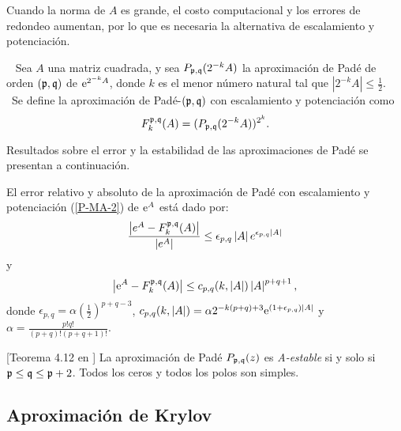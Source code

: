 Cuando la norma de $A$ es grande, el costo computacional y los errores de redondeo aumentan, por lo que
es necesaria la alternativa de escalamiento y potenciación.

\begin{definition}\cite{golub2013matrix}~
    Sea $A$ una matriz cuadrada, y sea $P_{\pf,\qf}(2^{-k}A%
    )$ la aproximación de Padé de orden $(\mathfrak{p},\mathfrak{q})\ $de $\me{2^{-k}A%
    }$, donde $k$ es el menor número natural tal que $\left\vert 2^{-k}A%
    \right\vert \leq \frac{1}{2}$. \ Se define la aproximación de  Padé-$(\mathfrak{p},\mathfrak{q})$ con escalamiento y potenciación como 
    \begin{equation}
    F_{k}^{\mathfrak{p},\mathfrak{q}}(A)=(P_{\mathfrak{p},\mathfrak{q}}(2^{-k}A))^{2^{k}}.
    \label{P-MA-2}
    \end{equation}
\end{definition}

Resultados sobre el error y la estabilidad de las aproximaciones de Padé se presentan a continuación.

\begin{theorem}
    \label{Conv. Pade}\cite{jimenez2012convergence} El error
    relativo y absoluto de la aproximación de Padé con escalamiento y
    potenciación (\ref{P-MA-2}) de $\mathrm{e}^{A}$ está dado por: 
    \[
    \frac{\left\vert e^{A}-F_{k}^{\mathfrak{p},\mathfrak{q}}(A)\right\vert 
    }{\left\vert e^{A}\right\vert }\leq \epsilon _{p,q}\left\vert 
    A\right\vert e^{\epsilon _{p,q}\left\vert A\right\vert }
    \]%
    y 
    \begin{equation}
    \left\vert \mathrm{e}^{A}-F_{k}^{\mathfrak{p},\mathfrak{q}}(A)\right\vert \leq
    c_{p,q}(k,\left\vert A\right\vert )\left\vert A\right\vert
    ^{p+q+1}, \label{errpade}
    \end{equation}
    donde $\epsilon _{p,q}=\alpha (\frac{1}{2})^{p+q-3}$, $%
    c_{p,q}(k,\left\vert A\right\vert )=\alpha
    2^{-k(p+q)+3}\me{(1+\epsilon _{p,q})\left\vert A\right\vert }$ y $%
    \alpha =\frac{p!q!}{(p+q)!(p+q+1)!}$.
\end{theorem}

\begin{theorem}\label{Stab. Pade}[Teorema 4.12 en \cite{wanner1996solving}] 
    La aproximación de Padé $P_{\mathfrak{p},\mathfrak{q}}(z)$  es \emph{A-estable} si y solo si $\mathfrak{p}\leq \mathfrak{q}\leq \mathfrak{p}+2$. 
    Todos los ceros y todos los polos son simples.
\end{theorem}

\subsection{Aproximación de Krylov}

